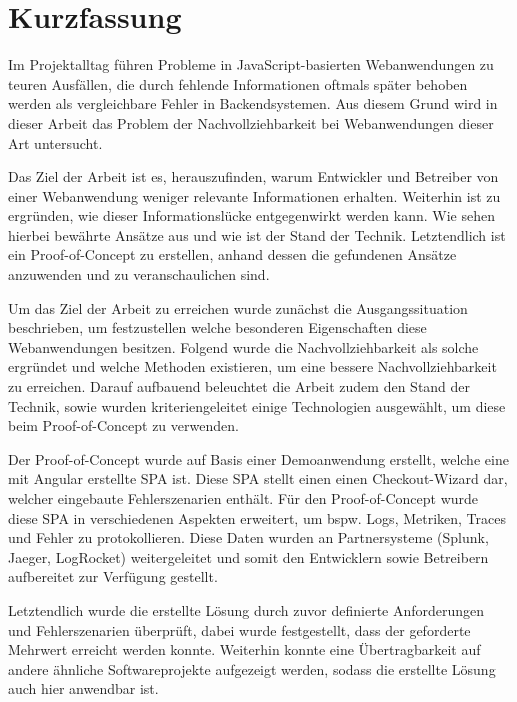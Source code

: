 \section*{\thispagestyle{empty}Kurzfassung}
	
Im Projektalltag führen Probleme in JavaScript-basierten Webanwendungen zu teuren Ausfällen, die durch fehlende Informationen oftmals später behoben werden als vergleichbare Fehler in Backendsystemen. Aus diesem Grund wird in dieser Arbeit das Problem der Nachvollziehbarkeit bei Webanwendungen dieser Art untersucht.
	
Das Ziel der Arbeit ist es, herauszufinden, warum Entwickler und Betreiber von einer Webanwendung weniger relevante Informationen erhalten. Weiterhin ist zu ergründen, wie dieser Informationslücke entgegenwirkt werden kann. Wie sehen hierbei bewährte Ansätze aus und wie ist der Stand der Technik. Letztendlich ist ein Proof-of-Concept zu erstellen, anhand dessen die gefundenen Ansätze anzuwenden und zu veranschaulichen sind.

Um das Ziel der Arbeit zu erreichen wurde zunächst die Ausgangssituation beschrieben, um festzustellen welche besonderen Eigenschaften diese Webanwendungen besitzen. Folgend wurde die Nachvollziehbarkeit als solche ergründet und welche Methoden existieren, um eine bessere Nachvollziehbarkeit zu erreichen. Darauf aufbauend beleuchtet die Arbeit zudem den Stand der Technik, sowie wurden kriteriengeleitet einige Technologien ausgewählt, um diese beim Proof-of-Concept zu verwenden.

Der Proof-of-Concept wurde auf Basis einer Demoanwendung erstellt, welche eine mit Angular erstellte SPA ist. Diese SPA stellt einen einen Checkout-Wizard dar, welcher eingebaute Fehlerszenarien enthält. Für den Proof-of-Concept wurde diese SPA in verschiedenen Aspekten erweitert, um bspw. Logs, Metriken, Traces und Fehler zu protokollieren. Diese Daten wurden an Partnersysteme (Splunk, Jaeger, LogRocket) weitergeleitet und somit den Entwicklern sowie Betreibern aufbereitet zur Verfügung gestellt.

Letztendlich wurde die erstellte Lösung durch zuvor definierte Anforderungen und Fehlerszenarien überprüft, dabei wurde festgestellt, dass der geforderte Mehrwert erreicht werden konnte. Weiterhin konnte eine Übertragbarkeit auf andere ähnliche Softwareprojekte aufgezeigt werden, sodass die erstellte Lösung auch hier anwendbar ist.

